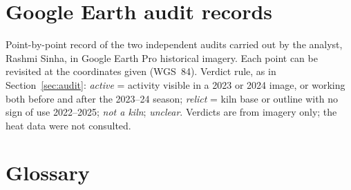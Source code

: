 \documentclass[11pt,a4paper]{article}
\begin{document}
\section{Google Earth audit records}\label{app:audits}
Point-by-point record of the two independent audits carried out by the analyst,
Rashmi Sinha, in Google Earth Pro historical imagery. Each point can be revisited at
the coordinates given (WGS~84). Verdict rule, as in Section~\ref{sec:audit}:
\emph{active} = activity visible in a 2023 or 2024 image, or working both before
and after the 2023--24 season; \emph{relict} = kiln base or outline with no sign
of use 2022--2025; \emph{not a kiln}; \emph{unclear}. Verdicts are from imagery
only; the heat data were not consulted.



\section{Glossary}
\end{document}
